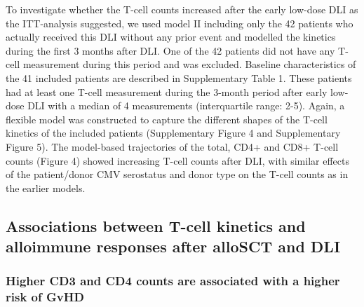 \documentclass[
  letterpaper,
  DIV=11,
  numbers=noendperiod]{scrreprt}
\begin{document}
To investigate whether the T-cell counts increased after the early
low-dose DLI as the ITT-analysis suggested, we used model II including
only the 42 patients who actually received this DLI without any prior
event and modelled the kinetics during the first 3 months after DLI. One
of the 42 patients did not have any T-cell measurement during this
period and was excluded. Baseline characteristics of the 41 included
patients are described in Supplementary Table 1. These patients had at
least one T-cell measurement during the 3-month period after early
low-dose DLI with a median of 4 measurements (interquartile range: 2-5).
Again, a flexible model was constructed to capture the different shapes
of the T-cell kinetics of the included patients (Supplementary Figure 4
and Supplementary Figure 5). The model-based trajectories of the total,
CD4+ and CD8+ T-cell counts (Figure 4) showed increasing T-cell counts
after DLI, with similar effects of the patient/donor CMV serostatus and
donor type on the T-cell counts as in the earlier models.

\hypertarget{associations-between-t-cell-kinetics-and-alloimmune-responses-after-allosct-and-dli}{%
\subsection{Associations between T-cell kinetics and alloimmune
responses after alloSCT and
DLI}\label{associations-between-t-cell-kinetics-and-alloimmune-responses-after-allosct-and-dli}}

\hypertarget{higher-cd3-and-cd4-counts-are-associated-with-a-higher-risk-of-gvhd}{%
\subsubsection{Higher CD3 and CD4 counts are associated with a higher
risk of
GvHD}\label{higher-cd3-and-cd4-counts-are-associated-with-a-higher-risk-of-gvhd}}
\end{document}
